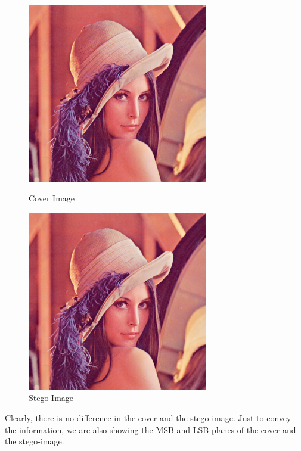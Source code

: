 \documentclass{report}
\begin{document}
\begin{figure}[H]
\centering
\begin{minipage}{0.46\linewidth}
\centering
\includegraphics[width=0.7\textwidth]{images/lenna.png}
\caption{Cover Image}
\end{minipage}
\hfill
\begin{minipage}{0.46\linewidth}
\centering
\includegraphics[width=0.7\textwidth]{images/stego-lenna.png}
\caption{Stego Image}
\end{minipage}
\end{figure}
Clearly, there is no difference in the cover and the stego image. Just to convey the information, we are also showing the MSB and LSB planes of the cover and the stego-image.
\end{document}
